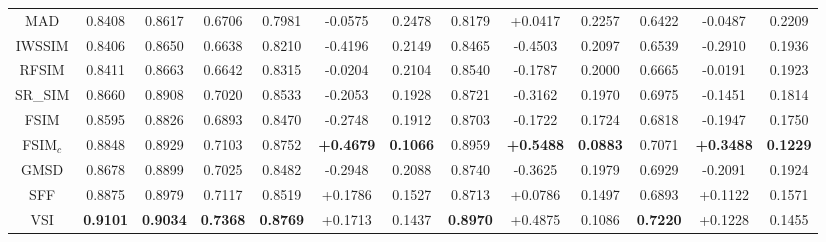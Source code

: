 \begin{table*}[htb]
\begin{tabular}{c|ccc|l|ccc|ccc|ccc}
MAD \cite{MAD}                       & 0.8408            & 0.8617            & \multicolumn{2}{c|}{0.6706}          & 0.7981          & -0.0575          & 0.2478          & 0.8179          & +0.0417          & 0.2257          & 0.6422          & -0.0487          & 0.2209          \\
IWSSIM \cite{IWSSIM}                     & 0.8406            & 0.8650            & \multicolumn{2}{c|}{0.6638}          & 0.8210          & -0.4196          & 0.2149          & 0.8465          & -0.4503          & 0.2097          & 0.6539          & -0.2910          & 0.1936  \\
RFSIM \cite{RFSIM}                      & 0.8411            & 0.8663            & \multicolumn{2}{c|}{0.6642}          & 0.8315          & -0.0204          & 0.2104          & 0.8540 & -0.1787          & 0.2000          & 0.6665          & -0.0191          & 0.1923          \\
SR\_SIM \cite{SRSIM}                   & 0.8660            & 0.8908            & \multicolumn{2}{c|}{0.7020}          & 0.8533          & -0.2053          & 0.1928          & 0.8721          & -0.3162          & 0.1970          & 0.6975          & -0.1451          & 0.1814          \\
FSIM \cite{FSIM}                      & 0.8595            & 0.8826            & \multicolumn{2}{c|}{0.6893}          & 0.8470          & -0.2748          & 0.1912          & 0.8703          & -0.1722          & 0.1724          & 0.6818          & -0.1947          & 0.1750          \\
FSIM$_c$ \cite{FSIM}    & 0.8848            & 0.8929            & \multicolumn{2}{c|}{0.7103}          & 0.8752 & \textbf{+0.4679} & \textbf{0.1066} & 0.8959          & \textbf{+0.5488} & \textbf{0.0883} & 0.7071 & \textbf{+0.3488} & \textbf{0.1229} \\
GMSD \cite{GMSD}                      & 0.8678            & 0.8899            & \multicolumn{2}{c|}{0.7025}          & 0.8482          & -0.2948          & 0.2088          & 0.8740 & -0.3625          & 0.1979          & 0.6929          & -0.2091          & 0.1924          \\
SFF \cite{SFF}                        & 0.8875   & 0.8979   & \multicolumn{2}{c|}{0.7117} & 0.8519          & +0.1786 & 0.1527          & 0.8713          & +0.0786          & 0.1497          & 0.6893          & +0.1122          & 0.1571          \\
VSI \cite{VSI}                       & \textbf{0.9101}   & \textbf{0.9034}   & \multicolumn{2}{c|}{\textbf{0.7368}} & \textbf{0.8769} & +0.1713          & 0.1437 & \textbf{0.8970} & +0.4875          & 0.1086 & \textbf{0.7220} & +0.1228          & 0.1455          \\

\end{tabular}
\end{table*}
